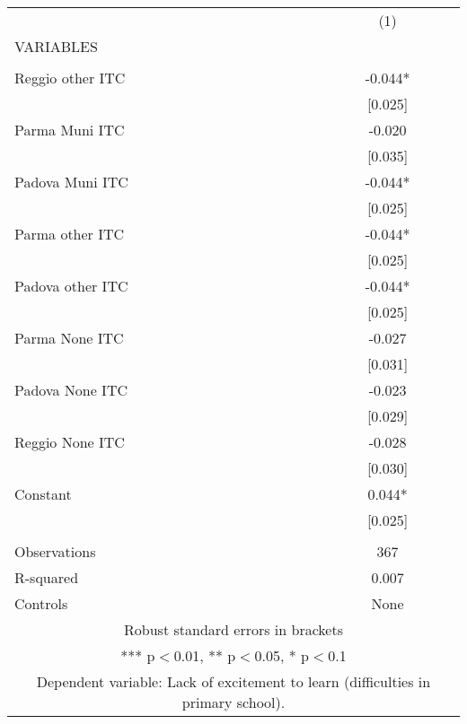 \begin{tabular}{lc} \hline
 & (1) \\
VARIABLES &  \\ \hline
 &  \\
Reggio other ITC & -0.044* \\
 & [0.025] \\
Parma Muni ITC & -0.020 \\
 & [0.035] \\
Padova Muni ITC & -0.044* \\
 & [0.025] \\
Parma other ITC & -0.044* \\
 & [0.025] \\
Padova other ITC & -0.044* \\
 & [0.025] \\
Parma None ITC & -0.027 \\
 & [0.031] \\
Padova None ITC & -0.023 \\
 & [0.029] \\
Reggio None ITC & -0.028 \\
 & [0.030] \\
Constant & 0.044* \\
 & [0.025] \\
 &  \\
Observations & 367 \\
R-squared & 0.007 \\
 Controls & None \\ \hline
\multicolumn{2}{c}{ Robust standard errors in brackets} \\
\multicolumn{2}{c}{ *** p$<$0.01, ** p$<$0.05, * p$<$0.1} \\
\multicolumn{2}{c}{ Dependent variable: Lack of excitement to learn (difficulties in primary school).} \\
\end{tabular}
